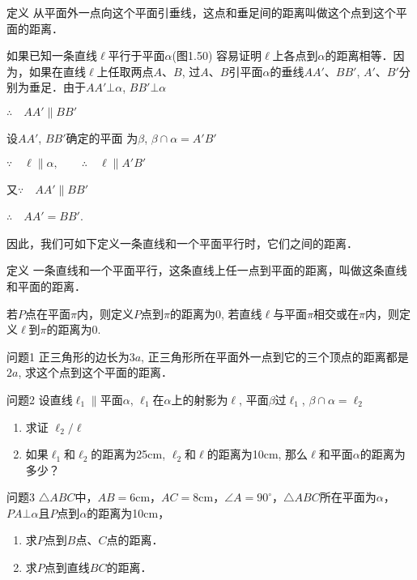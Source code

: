  \begin{blk}
    {定义} 从平面外一点向这个平面引垂线，这点和垂足间的距离叫做这个点到这个平面的距离．
  \end{blk}
  
  如果已知一条直线$\ell$平行于平面$\alpha$(图1.50) 容易证明$\ell$上各点到$\alpha$的距离相等．因为，如果在直线$\ell$上任取两点$A$、$B$, 过$A$、$B$引平面$\alpha$的垂线$AA'$、$BB'$, $A'$、$B'$分别为垂足．由于$AA'\bot\alpha$, $BB'\bot \alpha$
  
  $\therefore\quad AA'\parallel BB'$
  
  设$AA'$, $BB'$确定的平面
  为$\beta$, $\beta\cap\alpha=A'B'$
  
  $\because\quad \ell\parallel \alpha,\qquad \therefore\quad \ell\parallel A'B'$
  
  又$\because\quad AA'\parallel BB'$
  
  $\therefore\quad AA'=BB'$.
  
  因此，我们可如下定义一条直线和一个平面平行时，它们之间的距离．
  
  \begin{blk}
    {定义} 一条直线和一个平面平行，这条直线上任一点到平面的距离，叫做这条直线和平面的距离．
  \end{blk}
  
  若$P$点在平面$\pi$内，则定义$P$点到$\pi$的距离为0, 若直线$\ell$与平面$\pi$相交或在$\pi$内，则定义$\ell$到$\pi$的距离为0.
  
  \begin{blk}
    {问题1} 正三角形的边长为$3a$, 正三角形所在平面外一点到它的三个顶点的距离都是$2a$, 求这个点到这个平面的距离．
  \end{blk}
  
  \begin{blk}
    {问题2} 设直线$\ell_1\parallel$平面$\alpha$, $\ell_1$在$\alpha$上的射影为$\ell$, 平面$\beta$过$\ell_1$, $\beta\cap\alpha=\ell_2$ 
  \begin{enumerate}
    \item 求证 $\ell_2/\ell$
    \item 如果$\ell_1$和$\ell_2$的距离为25cm, $\ell_2$和$\ell$的距离为10cm, 那么$\ell$和平面$\alpha$的距离为多少？
  \end{enumerate}
  \end{blk}
  
  \begin{blk}{问题3} 
    $\triangle ABC$中，$AB=6$cm，$AC=8$cm，$\angle A=90^{\circ}$，$\triangle ABC$所在平面为$\alpha$，$PA\bot \alpha$且$P$点到$\alpha$的距离为10cm，
  \begin{enumerate}
    \item 求$P$点到$B$点、$C$点的距离．
    \item 求$P$点到直线$BC$的距离．
  \end{enumerate}
  \end{blk}
  
